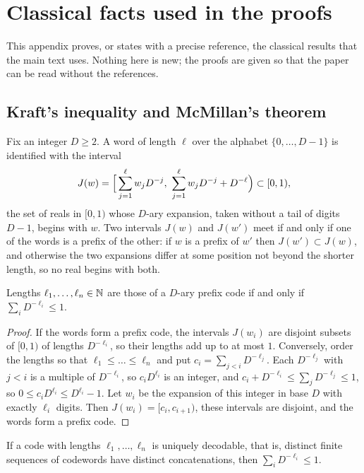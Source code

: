 \section{Classical facts used in the proofs}\label{app:derivations}

This appendix proves, or states with a precise reference, the classical results that the main text uses. Nothing here is new; the proofs are given so that the paper can be read without the references.

\subsection{Kraft's inequality and McMillan's theorem}\label{app:kraft}

Fix an integer $D\ge2$. A word of length $\ell$ over the alphabet $\{0,\dots,D-1\}$ is identified with the interval
\[
J(w)=\Bigl[\,\sum_{j=1}^{\ell}w_{j}D^{-j},\ \sum_{j=1}^{\ell}w_{j}D^{-j}+D^{-\ell}\Bigr)\subset[0,1),
\]
the set of reals in $[0,1)$ whose $D$-ary expansion, taken without a tail of digits $D-1$, begins with $w$. Two intervals $J(w)$ and $J(w')$ meet if and only if one of the words is a prefix of the other: if $w$ is a prefix of $w'$ then $J(w')\subset J(w)$, and otherwise the two expansions differ at some position not beyond the shorter length, so no real begins with both.

\begin{proposition}[Kraft]
Lengths $\ell_{1},\dots,\ell_{n}\in\mathbb{N}$ are those of a $D$-ary prefix code if and only if $\sum_{i}D^{-\ell_{i}}\le1$.
\end{proposition}

\begin{proof}
If the words form a prefix code, the intervals $J(w_{i})$ are disjoint subsets of $[0,1)$ of lengths $D^{-\ell_{i}}$, so their lengths add up to at most $1$. Conversely, order the lengths so that $\ell_{1}\le\dots\le\ell_{n}$ and put $c_{i}=\sum_{j<i}D^{-\ell_{j}}$. Each $D^{-\ell_{j}}$ with $j<i$ is a multiple of $D^{-\ell_{i}}$, so $c_{i}D^{\ell_{i}}$ is an integer, and $c_{i}+D^{-\ell_{i}}\le\sum_{j}D^{-\ell_{j}}\le1$, so $0\le c_{i}D^{\ell_{i}}\le D^{\ell_{i}}-1$. Let $w_{i}$ be the expansion of this integer in base $D$ with exactly $\ell_{i}$ digits. Then $J(w_{i})=[c_{i},c_{i+1})$, these intervals are disjoint, and the words form a prefix code.
\end{proof}

\begin{proposition}[McMillan]
If a code with lengths $\ell_{1},\dots,\ell_{n}$ is uniquely decodable, that is, distinct finite sequences of codewords have distinct concatenations, then $\sum_{i}D^{-\ell_{i}}\le1$.
\end{proposition}

